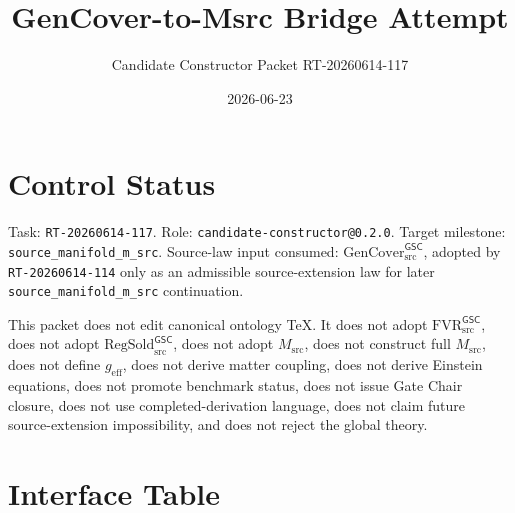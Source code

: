 \documentclass[11pt]{article}
\title{GenCover-to-Msrc Bridge Attempt}
\author{Candidate Constructor Packet RT-20260614-117}
\date{2026-06-23}
\newcommand{\GSC}{\mathsf{GSC}}
\newcommand{\Msrc}{M_{\mathrm{src}}}
\newcommand{\GenCover}{\mathrm{GenCover}_{\mathrm{src}}^{\GSC}}
\begin{document}
\maketitle

\section{Control Status}

Task: \texttt{RT-20260614-117}. Role:
\texttt{candidate-constructor@0.2.0}. Target milestone:
\texttt{source\_manifold\_m\_src}. Source-law input consumed:
\(\GenCover\), adopted by \texttt{RT-20260614-114} only as an
admissible source-extension law for later \texttt{source\_manifold\_m\_src}
continuation.

This packet does not edit canonical ontology TeX. It does not adopt
\(\mathrm{FVR}_{\mathrm{src}}^{\GSC}\), does not adopt
\(\mathrm{RegSold}_{\mathrm{src}}^{\GSC}\), does not adopt \(\Msrc\), does
not construct full \(\Msrc\), does not define \(g_{\mathrm{eff}}\), does not
derive matter coupling, does not derive Einstein equations, does not promote
benchmark status, does not issue Gate Chair closure, does not use
completed-derivation language, does not claim future source-extension
impossibility, and does not reject the global theory.

\section{Interface Table}
\end{document}
